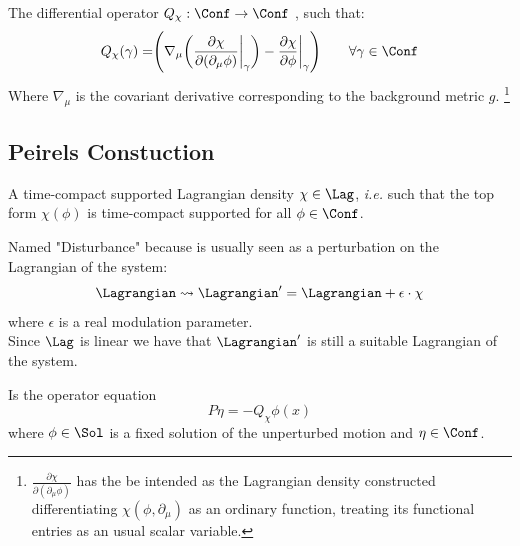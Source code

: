 \documentclass[a4paper,11pt]{scrartcl}
\begin{document}
	\begin{definition}
		The  differential operator $Q_\chi : \Conf \rightarrow \Conf$	, such that:
		\begin{displaymath}
			Q_\chi (\gamma) = \Biggr( \nabla_\mu \biggr( \frac{\partial \chi}{\partial(\partial_\mu \phi)} \biggr\vert_\gamma \biggr) - \frac{\partial \chi}{\partial \phi}\biggr\vert_\gamma \Biggr) \qquad \forall \gamma \in \Conf	
		\end{displaymath}
		Where $\nabla_\mu$ is the covariant derivative corresponding to the background metric $g$.
		\footnote{$\frac{\partial \chi}{\partial(\partial_\mu \phi)}$ has the be intended as the Lagrangian density constructed differentiating $\chi(\phi, \partial_\mu)$ as an ordinary function, treating its functional entries as an usual scalar variable.}
	\end{definition}

	\subsection*{Peirels Constuction}

	\begin{definition}[Disturbance]
		A time-compact supported Lagrangian density $\chi \in \Lag$, \emph{i.e.}
		such that the top form $\chi(\phi)$ is time-compact supported for all $\phi \in \Conf$.
	\end{definition}

	\begin{remark}
	Named "Disturbance" because is usually seen as a perturbation on the Lagrangian of the system:
		\begin{displaymath}
			\Lagrangian \rightsquigarrow \Lagrangian' = \Lagrangian + \epsilon\cdot \chi
		\end{displaymath}
		where $\epsilon$  is a real modulation parameter.\\
		Since $\Lag$ is linear we have that $\Lagrangian'$ is still a suitable Lagrangian of the system.	
	\end{remark}

	\begin{definition}
		Is the operator equation
		\begin{equation}\label{PeierlJacobiEqLin}
			P \eta = - Q_\chi \phi(x)
		\end{equation}
		where $\phi \in \Sol$ is a fixed solution of the unperturbed motion and $\eta \in \Conf$.
	\end{definition}
	
\end{document}
